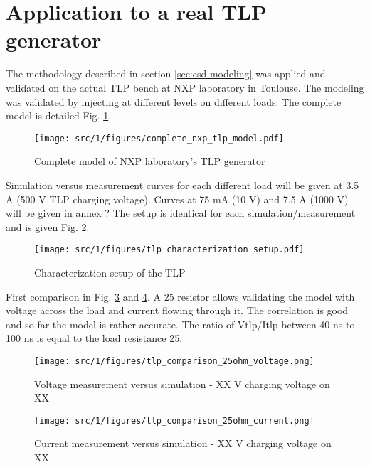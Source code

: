 \section{Application to a real TLP generator}
\label{sec:tlp-modeling}

The methodology described in section \ref{sec:esd-modeling} was applied and validated on the actual TLP bench at NXP laboratory in Toulouse.
The modeling was validated by injecting at different levels on different loads.
The complete model is detailed Fig. \ref{fig:complete-tlp-model}.


\begin{figure}[!h]
  \centering
  \texttt{[image: src/1/figures/complete\_nxp\_tlp\_model.pdf]}
  \caption{Complete model of NXP laboratory's TLP generator}
  \label{fig:complete-tlp-model}
\end{figure}

Simulation versus measurement curves for each different load will be given at 3.5 A (500 V TLP charging voltage).
Curves at 75 mA (10 V) and 7.5 A (1000 V) will be given in annex ?
The setup is identical for each simulation/measurement and is given Fig. \ref{fig:setup-cz-tlp-model}.

\begin{figure}[!h]
  \centering
  \texttt{[image: src/1/figures/tlp\_characterization\_setup.pdf]}
  \caption{Characterization setup of the TLP}
  \label{fig:setup-cz-tlp-model}
\end{figure}

First comparison in Fig. \ref{fig:comparison-tlp-1-v} and \ref{fig:comparison-tlp-1-i}.
A 25\textOmega{} resistor allows validating the model with voltage across the load and current flowing through it.
The correlation is good and so far the model is rather accurate.
The ratio of Vtlp/Itlp between 40 ns to 100 ns is equal to the load resistance 25\textOmega{}.

\begin{figure}[!h]
  \centering
  \texttt{[image: src/1/figures/tlp\_comparison\_25ohm\_voltage.png]}
  \caption{Voltage measurement versus simulation - XX V charging voltage on XX\textOmega{}}
  \label{fig:comparison-tlp-1-v}
\end{figure}

\begin{figure}[!h]
  \centering
  \texttt{[image: src/1/figures/tlp\_comparison\_25ohm\_current.png]}
  \caption{Current measurement versus simulation - XX V charging voltage on XX\textOmega{}}
  \label{fig:comparison-tlp-1-i}
\end{figure}

